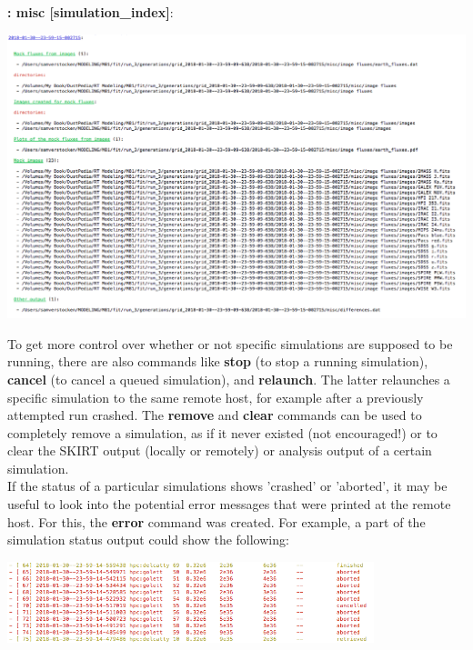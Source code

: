 \documentclass[15pt,a4paper,oneside,openright]{report}
\begin{document}
\textbf{: misc [simulation\_index]}:\\

\begin{center}
\includegraphics[width=1.\textwidth]{figures/misc.png}
\end{center}

To get more control over whether or not specific simulations are supposed to be running, there are also commands like \textbf{stop} (to stop a running simulation), \textbf{cancel} (to cancel a queued simulation), and \textbf{relaunch}. The latter relaunches a specific simulation to the same remote host, for example after a previously attempted run crashed. The \textbf{remove} and \textbf{clear} commands can be used to completely remove a simulation, as if it never existed (not encouraged!) or to clear the SKIRT output (locally or remotely) or analysis output of a certain simulation.\\

If the status of a particular simulations shows 'crashed' or 'aborted', it may be useful to look into the potential error messages that were printed at the remote host. For this, the \textbf{error} command was created. For example, a part of the simulation status output could show the following:

\begin{center}
\includegraphics[width=0.8\textwidth]{figures/aborted_cancelled.png}
\end{center}
\end{document}
